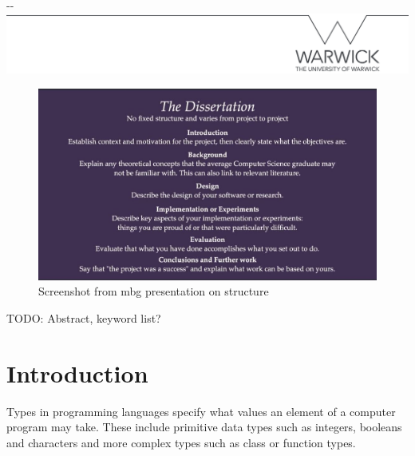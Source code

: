 \documentclass[a4paper,fleqn,12pt]{article}
\begin{document}
\makeatletter
\begin{titlepage}

\LARGE \@title \\
\Large \\[1.5cm]

\vfill 

\begin{adjustwidth}{-\oddsidemargin-1in}{-\rightmargin}
  \centering
  \includegraphics[width=\paperwidth]{line.png}
\end{adjustwidth}

\vspace*{-3.5cm}

\end{titlepage}
\makeatother

\pagestyle{plain}




\begin{figure}[h!]
  \centering
  \includegraphics[width=1.000\linewidth]{images/image4.jpg}
  \caption{Screenshot from mbg presentation on structure}
\end{figure}

TODO: Abstract, keyword list?
\section{Introduction}\label{id:h.6k9gcmunzldy}
Types in programming languages specify what values an element of a computer program may take. These include primitive data types such as integers, booleans and characters and more complex types such as class or function types.
\end{document}
